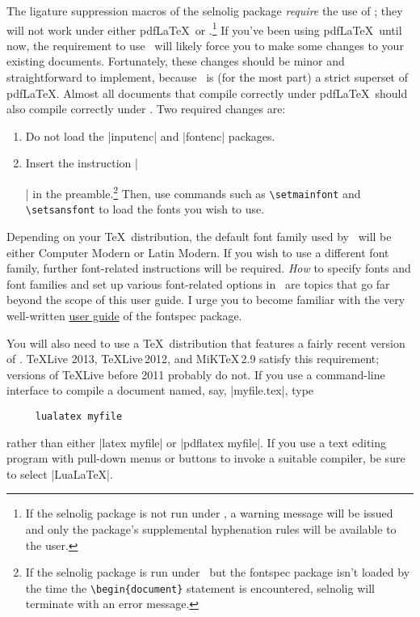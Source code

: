 \documentclass[11pt]{article}
\newcommand{\pkg}[1]{\textsf{#1}}
\newcommand{\cmmd}[1]{\texttt{\textbackslash #1}}
\begin{document}
\begingroup
\renewcommand\theenumi{(\roman{enumi})}
\renewcommand\labelenumi\theenumi

The ligature suppression macros of the \pkg{selnolig} package \emph{require} the use of \LuaLaTeX; they will not work under either pdf\LaTeX\ or \XeLaTeX.\footnote{If the \pkg{selnolig} package is not run under \LuaLaTeX, a warning message will be issued and only the package's supplemental hyphenation rules will be available to the user.}
If you've been using pdf\LaTeX\ until now, the requirement to use \LuaLaTeX\ will likely force you to make some changes to your existing documents. Fortunately, these changes should be minor and straightforward to implement, because \LuaLaTeX\ is (for the most part) a strict superset of pdf\LaTeX. Almost all documents that compile correctly under pdf\LaTeX\ should also compile correctly under \LuaLaTeX. Two required changes are: 
\begin{enumerate}
\item Do not load the |inputenc| and |fontenc| packages. \item Insert the instruction |\usepackage{fontspec}|
in the preamble.\footnote{If the \pkg{selnolig} package is run under \LuaLaTeX\ but the \pkg{fontspec} package isn't loaded by the time the \Verb+\begin{document}+ statement is encountered, \pkg{selnolig} will terminate with an error message.} Then, use commands such as \cmmd{setmainfont} and \cmmd{setsansfont} to load the fonts you wish to use.
\end{enumerate}
\endgroup


Depending on your \TeX\ distribution, the default font family used by \LuaLaTeX\ will be either Computer Modern or Latin Modern. If you wish to use a different font family, further font-related instructions will be required. \emph{How} to specify fonts and font families and set up various font-related options in \LuaLaTeX\ are topics that go far beyond the scope of this user guide. I urge you to become familiar with the very well-written
 \href{http://www.ctan.org/tex-archive/macros/latex/contrib/fontspec/fontspec.pdf}{user guide} of the \pkg{fontspec} package.

You will also need to use a \TeX\ distribution that features a fairly recent version of \LuaLaTeX. \TeX Live 2013, \TeX Live\,2012, and MiK\TeX\,2.9 satisfy this requirement; versions of \TeX Live before 2011 probably do not. If you use a command-line interface to compile a document named, say, |myfile.tex|, type 
\begin{Verbatim}
     lualatex myfile
\end{Verbatim}
rather than either |latex myfile| or |pdflatex myfile|. If you use a text editing program with pull-down menus or buttons to invoke a suitable compiler, be sure to select |LuaLaTeX|. 
\end{document}
